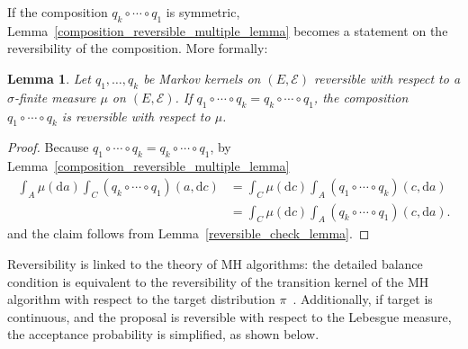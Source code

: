\documentclass[english,twoside,openright]{HYgraduMLDS}
\newtheorem{lemma}{Lemma}[chapter]
\newcommand{\dx}{\mathrm{d}}
\begin{document}
If the composition \(q_{k}\circ \dotsb \circ q_{1}\) is symmetric,
Lemma~\ref{composition_reversible_multiple_lemma} becomes a statement on the
reversibility of the composition. More formally:

\begin{lemma}\label{composition_reversible_symmetric_lemma}
  Let \(q_{1},\dotsc, q_{k}\) be Markov kernels on \((E, \mathcal{E})\) reversible
  with respect to a \(\sigma\)-finite measure \(\mu\) on \((E, \mathcal{E})\).
  If \(q_{1}\circ \dotsb \circ q_{k} = q_{k}\circ \dotsb \circ q_{1}\),
  the composition \(q_{1}\circ \dotsb \circ q_{k}\) is reversible with
  respect to \(\mu\).
\end{lemma}
\begin{proof}
  Because \(q_{1}\circ \dotsb \circ q_{k} = q_{k}\circ \dotsb \circ q_{1}\),
  by Lemma~\ref{composition_reversible_multiple_lemma}
  \begin{align*}
    \int_{A}\mu(\dx a)\int_{C}(q_{k}\circ \dotsb \circ q_{1})(a, \dx c)
    &= \int_{C}\mu(\dx c)\int_{A}(q_{1}\circ \dotsb \circ q_{k})(c, \dx a)
    \\&= \int_{C}\mu(\dx c)\int_{A}(q_{k}\circ \dotsb \circ q_{1})(c, \dx a).
  \end{align*}
  and the claim follows from Lemma~\ref{reversible_check_lemma}.
\end{proof}

Reversibility is linked to the theory of MH algorithms: the detailed balance
condition is equivalent to the reversibility of the transition kernel of
the MH algorithm with respect to the target distribution \(\pi\)~\cite{Tie98}.
Additionally, if target is continuous, and the proposal is reversible with
respect to the Lebesgue measure, the acceptance probability is simplified, as
shown below.
\end{document}
